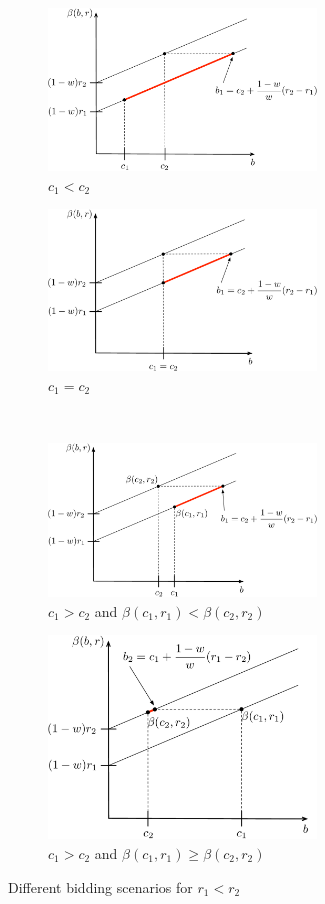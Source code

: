 \begin{figure}[p!]
	\vspace{0.5cm}
	\begin{subfigure}[b]{0.5\textwidth}
	  \includegraphics[width=2.8in]{Direct/Figures/complete_N_2_c1}
	  \caption{$c_1 < c_2$}
	  \label{fig:complete_N_2_c1_direct}
	\end{subfigure}
	\begin{subfigure}[b]{0.5\textwidth}
	  \includegraphics[width=2.8in]{Direct/Figures/complete_N_2_c2}
	  \caption{$c_1 = c_2$}
	  \label{fig:complete_N_2_c2_direct}
	\end{subfigure}
	\vspace{0.5cm}\\
	\begin{subfigure}[b]{0.5\textwidth}
	  \includegraphics[width=2.8in]{Direct/Figures/complete_N_2_c3_1}
	  \caption{$c_1 > c_2$ and $\beta(c_1,r_1) < \beta(c_2,r_2)$}
	  \label{fig:complete_N_2_c3_1_direct}
	\end{subfigure}
	\begin{subfigure}[b]{0.5\textwidth}
	  \includegraphics[width=2.8in]{Direct/Figures/complete_N_2_c3_2}
	  \caption{$c_1 > c_2$ and $\beta(c_1,r_1) \ge \beta(c_2,r_2)$}
	  \label{fig:complete_N_2_c3_2_direct}
	\end{subfigure}
	\caption{Different bidding scenarios for $r_1 < r_2$}
	\label{fig:complete_N_2_1_direct}
\end{figure}


